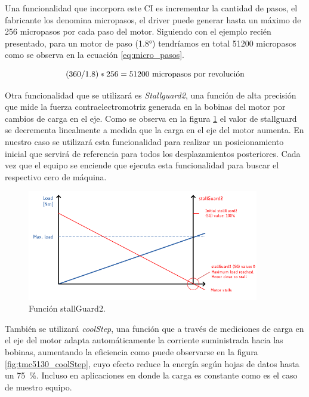 Una funcionalidad que incorpora este CI es incrementar la cantidad de pasos, el fabricante los denomina micropasos, el driver puede generar hasta un máximo de 256 micropasos por cada paso del motor. Siguiendo con el ejemplo recién presentado, para un motor de paso (\ang{1.8}) tendríamos en total 51200 micropasos como se observa en la ecuación \ref{eq:micro_pasos}.

\begin{equation}
	\label{eq:micro_pasos}
		(360/1.8) * 256 = 51200 \textup{ micropasos por revolución}
\end{equation}


Otra funcionalidad que se utilizará es \textit{Stallguard2}, una función de alta precisión que mide la fuerza contraelectromotriz generada en la bobinas del motor por cambios de carga en el eje. Como se observa en la figura \ref{fig:tmc5130_stallGuard2} el valor de stallguard se decrementa linealmente a medida que la carga en el eje del motor aumenta. En nuestro caso se utilizará esta funcionalidad para realizar un posicionamiento inicial que servirá de referencia para todos los desplazamientos posteriores. Cada vez que el equipo se enciende que ejecuta esta funcionalidad para buscar el respectivo cero de máquina.
     
\begin{figure}[htpb]
\centering 
\includegraphics[width=0.9\textwidth]{./Figures/tmc5130_stallguard2.png}
\caption{Función stallGuard2.}
\label{fig:tmc5130_stallGuard2}
\end{figure}

También se utilizará \textit{coolStep}, una función que a través de mediciones de carga en el eje del motor adapta automáticamente la corriente suministrada hacia las bobinas, aumentando la eficiencia como puede observarse en la figura \ref{fig:tmc5130_coolStep}, cuyo efecto reduce la energía según hojas de datos \citep{3_web_trinamic_producto} hasta un \SI{75}{\percent}. Incluso en aplicaciones en donde la carga es constante como es el caso de nuestro equipo.

